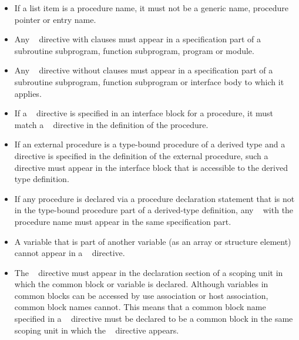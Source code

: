 \begin{fortranspecific}
\begin{itemize}
\item If a list item is a procedure name, it must not be a generic name, 
      procedure pointer or entry name.

\item Any ~ directive with clauses must appear 
      in a specification part of a subroutine subprogram, function subprogram,
      program or module.

\item Any ~ directive without clauses must appear 
      in a specification part of a subroutine subprogram, function subprogram 
      or interface body to which it applies.

\item If a ~ directive is specified in an 
      interface block for a procedure, it must match a 
      ~ directive in the definition of the 
      procedure.

\item If an external procedure is a type-bound procedure of a derived 
      type and a ~ directive is specified in 
      the definition of the external procedure, such a directive must 
      appear in the interface block that is accessible to the derived 
      type definition.

\item If any procedure is declared via a procedure declaration statement 
      that is not in the type-bound procedure part of a derived-type 
      definition, any ~ with the procedure 
      name must appear in the same specification part.

\item A variable that is part of another variable (as an array or structure 
      element) cannot appear in a ~ directive.

\item The ~ directive must appear in the 
      declaration section of a scoping unit in which the common block 
      or variable is declared. Although variables in common blocks can 
      be accessed by use association or host association, common block 
      names cannot. This means that a common block name specified in a 
      ~ directive must be declared to be a 
      common block in the same scoping unit in which the 
      ~ directive appears.


\end{itemize}
\end{fortranspecific}
